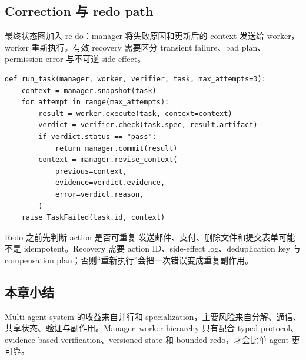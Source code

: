 \subsection{Correction 与 redo path}

最终状态图加入 re-do：manager 将失败原因和更新后的 context 发送给 worker，worker 重新执行。有效 recovery 需要区分 transient failure、bad plan、permission error 与不可逆 side effect。


\begin{lstlisting}[caption={Manager--worker verification 与 redo 的结构化协议}]
def run_task(manager, worker, verifier, task, max_attempts=3):
    context = manager.snapshot(task)
    for attempt in range(max_attempts):
        result = worker.execute(task, context=context)
        verdict = verifier.check(task.spec, result.artifact)
        if verdict.status == "pass":
            return manager.commit(result)
        context = manager.revise_context(
            previous=context,
            evidence=verdict.evidence,
            error=verdict.reason,
        )
    raise TaskFailed(task.id, context)
\end{lstlisting}

\begin{warningbox}{Redo 之前先判断 action 是否可重复}
发送邮件、支付、删除文件和提交表单可能不是 idempotent。Recovery 需要 action ID、side-effect log、deduplication key 与 compensation plan；否则“重新执行”会把一次错误变成重复副作用。
\end{warningbox}


\subsection{本章小结}

Multi-agent system 的收益来自并行和 specialization，主要风险来自分解、通信、共享状态、验证与副作用。Manager--worker hierarchy 只有配合 typed protocol、evidence-based verification、versioned state 和 bounded redo，才会比单 agent 更可靠。

